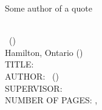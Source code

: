 \documentclass[
11pt, %
oneside, %
english, %
singlespacing, %
]{macthesis} %
\def\blankpage{%
      \clearpage%
      \thispagestyle{empty}%
      \addtocounter{page}{-1}%
      \null%
      \clearpage}
\begin{document}
\hfill\textemdash Some author of a quote

\blankpage
\clearpage




\blankpage
\clearpage


\newpage
{} %
\setcounter{page}{2} %

\noindent %
\univname \\
\degreename\, (\the\year) \\
Hamilton, Ontario (\deptname) \\[1.5cm]
TITLE: \ttitle \\
AUTHOR: \authorname\,  %
(\univname)  \\
SUPERVISOR: \supname\, \\
NUMBER OF PAGES: \pageref{lastoffront}, \pageref{LastPage}  %

\clearpage

\end{document}
